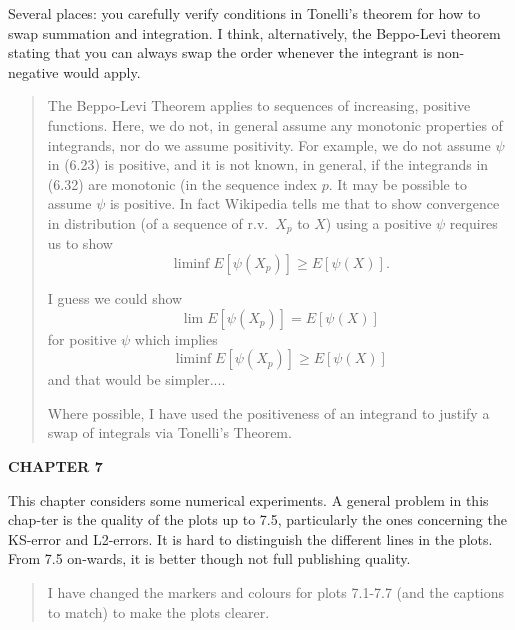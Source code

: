 \documentclass[a4paper]{article}
\begin{document}
Several places: you carefully verify conditions in Tonelli's theorem for how to swap summation and integration. I think, alternatively, the Beppo-Levi theorem stating that you can always swap the order whenever the integrant is non-negative would apply.
\begin{quote}
    The Beppo-Levi Theorem applies to sequences of increasing, positive functions. Here, we do not, in general assume any monotonic properties of integrands, nor do we assume positivity. For example, we do not assume \(\psi\) in (6.23) is positive, and it is not known, in general, if the integrands in (6.32) are monotonic (in the sequence index \(p\). It may be possible to assume \(\psi\) is positive. In fact Wikipedia tells me that to show convergence in distribution (of a sequence of r.v.~\(X_p\) to \(X\)) using a positive \(\psi\) requires us to show 
    \[\liminf E[\psi(X_p)]\geq E[\psi(X)].\]

    I guess we could show \[\lim E[\psi(X_p)]= E[\psi(X)]\] for positive \(\psi\) which implies \[\liminf E[\psi(X_p)]\geq E[\psi(X)]\] and that would be simpler.... 
    
    Where possible, I have used the positiveness of an integrand to justify a swap of integrals via Tonelli's Theorem. 
\end{quote}


\noindent\textbf{CHAPTER 7}

This chapter considers some numerical experiments. A general problem in this chap-ter is the quality of the plots up to 7.5, particularly the ones concerning the KS-error and L2-errors. It is hard to distinguish the different lines in the plots. From 7.5 on-wards, it is better though not full publishing quality.
\begin{quote}
    I have changed the markers and colours for plots 7.1-7.7 (and the captions to match) to make the plots clearer. 
\end{quote}
\end{document}
